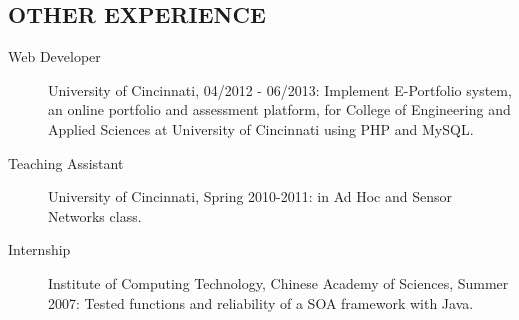 \documentclass[line]{res}
\begin{document}
\begin{resume}
	\section{OTHER EXPERIENCE}
	\begin{description}
		\item[Web Developer] University of Cincinnati, 04/2012 - 06/2013: Implement E-Portfolio system, an online portfolio and assessment platform, for College of Engineering and Applied Sciences at University of Cincinnati using PHP and MySQL. 
		\item[Teaching Assistant] University of Cincinnati, Spring 2010-2011: in Ad Hoc and Sensor Networks class.
		\item[Internship] Institute of Computing Technology, Chinese Academy of Sciences, Summer 2007: Tested functions and reliability of a SOA framework with Java.
	\end{description}

\end{resume}
\end{document}
